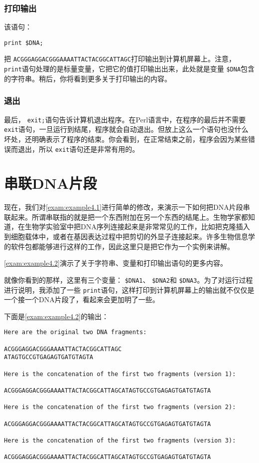 \subsubsection{打印输出}
该语句：

\begin{lstlisting}
print $DNA;
\end{lstlisting}
把 \verb|ACGGGAGGACGGGAAAATTACTACGGCATTAGC|打印输出到计算机屏幕上。注意， \verb|print|语句处理的是标量变量，它把它的值打印输出出来，此处就是变量 \verb|$DNA|包含的字符串。稍后，你将看到更多关于打印输出的内容。

\subsubsection{退出}
最后， \verb|exit;|语句告诉计算机退出程序。在Perl语言中，在程序的最后并不需要 \verb|exit|语句，一旦运行到结尾，程序就会自动退出。但放上这么一个语句也没什么坏处，还明确表示了程序的结束。你会看到，在正常结束之前，程序会因为某些错误而退出，所以 \verb|exit|语句还是非常有用的。

\section{串联DNA片段}
现在，我们对\autoref{exam:example4.1}进行简单的修改，来演示一下如何把DNA片段串联起来。所谓串联指的就是把一个东西附加在另一个东西的结尾上。生物学家都知道，在生物学实验室中把DNA序列连接起来是非常常见的工作，比如把克隆插入到细胞载体中，或者在基因表达过程中把剪切的外显子连接起来。许多生物信息学的软件包都能够进行这样的工作，因此这里只是把它作为一个实例来讲解。

\autoref{exam:example4.2}演示了关于字符串、变量和打印输出语句的更多内容。



就像你看到的那样，这里有三个变量： \verb|$DNA1|、 \verb|$DNA2|和 \verb|$DNA3|。为了对运行过程进行说明，我添加了一些 \verb|print|语句，这样打印到计算机屏幕上的输出就不仅仅是一个接一个DNA片段了，看起来会更加明了一些。

下面是\autoref{exam:example4.2}的输出：

\begin{lstlisting}
Here are the original two DNA fragments:

ACGGGAGGACGGGAAAATTACTACGGCATTAGC
ATAGTGCCGTGAGAGTGATGTAGTA

Here is the concatenation of the first two fragments (version 1):

ACGGGAGGACGGGAAAATTACTACGGCATTAGCATAGTGCCGTGAGAGTGATGTAGTA

Here is the concatenation of the first two fragments (version 2):

ACGGGAGGACGGGAAAATTACTACGGCATTAGCATAGTGCCGTGAGAGTGATGTAGTA

Here is the concatenation of the first two fragments (version 3):

ACGGGAGGACGGGAAAATTACTACGGCATTAGCATAGTGCCGTGAGAGTGATGTAGTA
\end{lstlisting}

